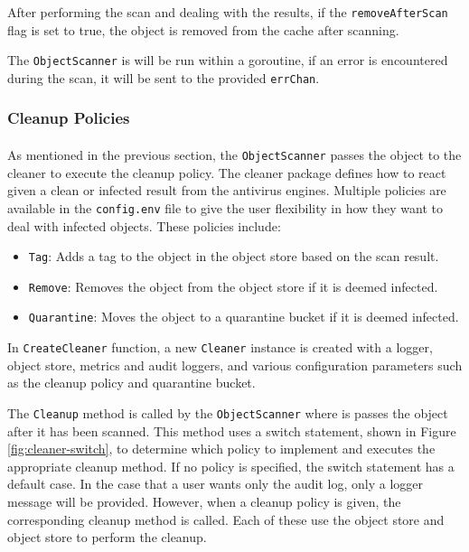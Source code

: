 \documentclass[12pt, conference, final, a4paper, onecolumn, compsoc]{IEEEtran}
\begin{document}
After performing the scan and dealing with the results, if the
\texttt{removeAfterScan} flag is set to true, the object is removed from the
cache after scanning.

The \texttt{ObjectScanner} is will be run within a goroutine, if an error is
encountered during the scan, it will be sent to the provided \texttt{errChan}.

\subsubsection*{Cleanup Policies}
\paragraph{}

As mentioned in the previous section, the \texttt{ObjectScanner} passes the
object to the cleaner to execute the cleanup policy. The cleaner package defines
how to react given a clean or infected result from the antivirus engines.
Multiple policies are available in the \texttt{config.env} file to give the user
flexibility in how they want to deal with infected objects. These policies
include:

\begin{itemize}
  \item \texttt{Tag}: Adds a tag to the object in the object store based on the
        scan result.
  \item \texttt{Remove}: Removes the object from the object store if it is
        deemed infected.
  \item \texttt{Quarantine}: Moves the object to a quarantine bucket if it is
        deemed infected.
\end{itemize}

In \texttt{CreateCleaner} function, a new \texttt{Cleaner} instance is created
with a logger, object store, metrics and audit loggers, and various
configuration parameters such as the cleanup policy and quarantine bucket.

The \texttt{Cleanup} method is called by the \texttt{ObjectScanner} where is
passes the object after it has been scanned. This method uses a switch
statement, shown in Figure \ref{fig:cleaner-switch}, to determine which policy
to implement and executes the appropriate cleanup method. If no policy is
specified, the switch statement has a default case. In the case that a user
wants only the audit log, only a logger message will be provided. However, when
a cleanup policy is given, the corresponding cleanup method is called. Each of
these use the object store and object store to perform the cleanup.
\end{document}

